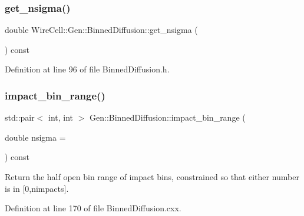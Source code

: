 \subsubsection{\texorpdfstring{get\+\_\+nsigma()}{get\_nsigma()}}
{\footnotesize\ttfamily double Wire\+Cell\+::\+Gen\+::\+Binned\+Diffusion\+::get\+\_\+nsigma (\begin{DoxyParamCaption}{ }\end{DoxyParamCaption}) const\hspace{0.3cm}{\ttfamily [inline]}}



Definition at line 96 of file Binned\+Diffusion.\+h.

\mbox{\label{class_wire_cell_1_1_gen_1_1_binned_diffusion_a7b7d0d8f0c0357f7a015dce980b07afc}} 
\subsubsection{\texorpdfstring{impact\+\_\+bin\+\_\+range()}{impact\_bin\_range()}}
{\footnotesize\ttfamily std\+::pair$<$ int, int $>$ Gen\+::\+Binned\+Diffusion\+::impact\+\_\+bin\+\_\+range (\begin{DoxyParamCaption}\item[{double}]{nsigma = {} }\end{DoxyParamCaption}) const}

Return the half open bin range of impact bins, constrained so that either number is in \mbox{[}0,nimpacts\mbox{]}. 

Definition at line 170 of file Binned\+Diffusion.\+cxx.

